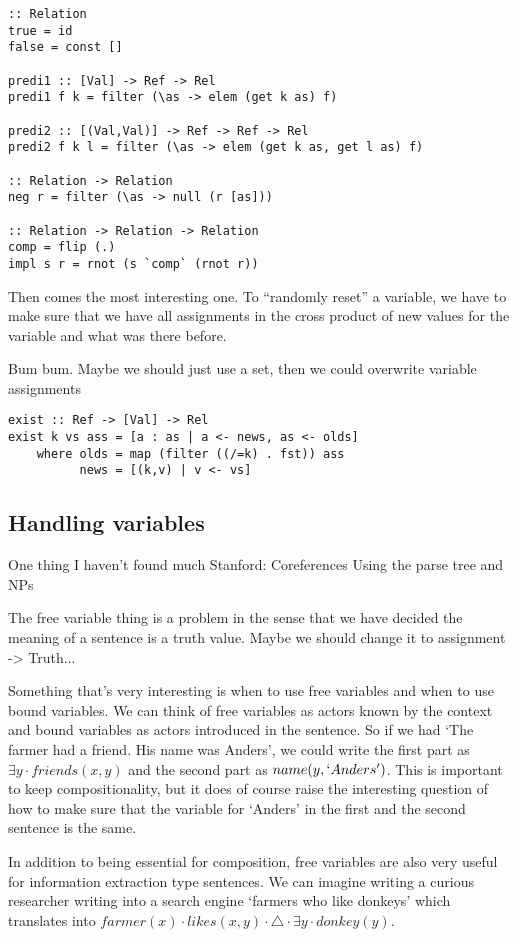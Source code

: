 \documentclass[12pt]{article}
\begin{document}
\begin{lstlisting}
:: Relation
true = id
false = const []

predi1 :: [Val] -> Ref -> Rel
predi1 f k = filter (\as -> elem (get k as) f)

predi2 :: [(Val,Val)] -> Ref -> Ref -> Rel
predi2 f k l = filter (\as -> elem (get k as, get l as) f)

:: Relation -> Relation
neg r = filter (\as -> null (r [as]))

:: Relation -> Relation -> Relation
comp = flip (.)
impl s r = rnot (s `comp` (rnot r))
\end{lstlisting}
Then comes the most interesting one. To ``randomly reset'' a variable, we have to make sure that we have all assignments in the cross product of new values for the variable and what was there before.

Bum bum. Maybe we should just use a set, then we could overwrite variable assignments
\begin{lstlisting}
exist :: Ref -> [Val] -> Rel
exist k vs ass = [a : as | a <- news, as <- olds]
	where olds = map (filter ((/=k) . fst)) ass
	      news = [(k,v) | v <- vs]
\end{lstlisting}

\subsection{Handling variables}
One thing I haven't found much \cite{visser1999donkey}
Stanford: \cite{lee2013deterministic}
\cite{lee2011stanford}
\cite{raghunathan2010multi}
Coreferences
Using the parse tree and NPs

The free variable thing is a problem in the sense that we have decided the meaning of a sentence is a truth value. Maybe we should change it to assignment -> Truth...

Something that's very interesting is when to use free variables and when to use bound variables. We can think of free variables as actors known by the context and bound variables as actors introduced in the sentence. So if we had `The farmer had a friend. His name was Anders', we could write the first part as $\exists y \cdot friends(x,y)$ and the second part as $name(y, `Anders')$. This is important to keep compositionality, but it does of course raise the interesting question of how to make sure that the variable for `Anders' in the first and the second sentence is the same.

In addition to being essential for composition, free variables are also very useful for information extraction type sentences. We can imagine writing a curious researcher writing into a search engine `farmers who like donkeys' which translates into $farmer(x) \cdot likes(x,y) \cdot \triangle \cdot \exists y \cdot donkey(y)$.
\end{document}
